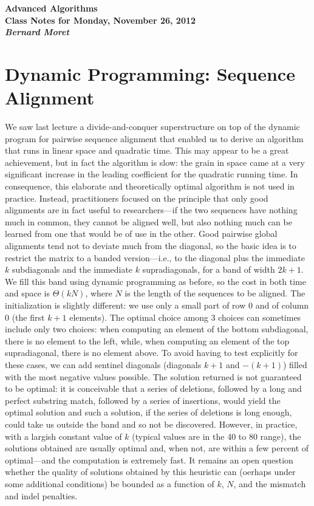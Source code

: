 \documentclass[11pt]{article}
\begin{document}
\begin{center}
  \LARGE\bf Advanced Algorithms\\

  \Large\sf
  Class Notes for Monday, November 26, 2012\\

  \it
  Bernard Moret
\end{center}

\bigskip

\section{Dynamic Programming: Sequence Alignment}
We saw last lecture a divide-and-conquer superstructure on top of the
dynamic program for pairwise sequence alignment that enabled us to
derive an algorithm that runs in linear space and quadratic time.
This may appear to be a great achievement, but in fact the algorithm
is slow: the grain in space came at a very significant increase
in the leading coefficient for the quadratic running time.  In
consequence, this elaborate and theoretically optimal algorithm is not
used in practice.  Instead, practitioners focused on the principle
that only good alignments are in fact useful to researchers---if the
two sequences have nothing much in common, they cannot be aligned
well, but also nothing much can be learned from one that would be
of use in the other.  Good pairwise global alignments tend not to deviate
much from the diagonal, so the basic idea is to restrict the matrix
to a banded version---i.e., to the diagonal plus the immediate $k$
subdiagonals and the immediate $k$ supradiagonals, for a band of
width $2k+1$.  We fill this band using dynamic programming as before,
so the cost in both time and space is $\Theta(kN)$, where $N$ is
the length of the sequences to be aligned.  The initialization is
slightly different: we use only a small part of row 0 and of column 0
(the first $k+1$ elements).  The optimal choice among 3 choices can
sometimes include only two choices: when computing an element of the bottom
subdiagonal, there is no element to the left, while, when computing
an element of the top supradiagonal, there is no element above.
To avoid having to test explicitly for these cases, we can add sentinel
diagonals (diagonals $k+1$ and $-(k+1)$) filled with the most negative
values possible.  The solution returned is not guaranteed to be optimal:
it is conceivable that a series of deletions, followed by a long and perfect
substring match, followed by a series of insertions, would yield the
optimal solution and such a solution, if the series of deletions is
long enough, could take us outside the band and so not be discovered.
However, in practice, with a largish constant value of $k$ (typical
values are in the 40 to 80 range), the solutions obtained are usually optimal
and, when not, are within a few percent of optimal---and the computation
is extremely fast.  It remains an open question whether the quality
of solutions obtained by this heuristic can (oerhaps under some additional
conditions) be bounded as a function of $k$, $N$, and the mismatch and indel
penalties.
\end{document}
